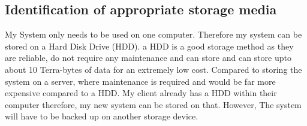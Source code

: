 \subsection{Identification of appropriate storage media}

My System only needs to be used on one computer. Therefore my system can be stored on a Hard Disk Drive (HDD). a HDD is a good storage method as they are reliable, do not require any maintenance and can store and can store upto about 10 Terra-bytes of data for an extremely low cost. Compared to storing the system on a server, where maintenance is required and would be far more expensive compared to a HDD. My client already has a HDD within their computer therefore, my new system can be stored on that. However, The system will have to be backed up on another storage device. \par

